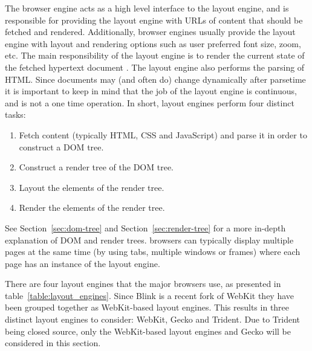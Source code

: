 \documentclass[a4paper,11pt]{kth-mag}
\begin{document}
        The \gls{browser} engine acts as a high level interface to the \gls{layout engine}, and is responsible for providing the \gls{layout engine} with \glspl{URL} of content that should be fetched and rendered.
        Additionally, \gls{browser} engines usually provide the \gls{layout engine} with layout and rendering options such as user preferred font size, zoom, etc.
        The main responsibility of the \gls{layout engine} is to render the current state of the fetched \gls{hypertext} \gls{document} \cite{garsiel2011browsers}.
        The \gls{layout engine} also performs the parsing of \gls{HTML}.
        Since \glspl{document} may (and often do) change dynamically after parsetime it is important to keep in mind that the job of the \gls{layout engine} is continuous, and is not a one time operation.
        In short, \glspl{layout engine} perform four distinct tasks:
        \begin{enumerate}
          \item Fetch content (typically \gls{HTML}, \gls{CSS} and \gls{JavaScript}) and parse it in order to construct a \gls{DOM} tree. 
          \item Construct a \gls{render tree} of the \gls{DOM} tree.
          \item Layout the \glspl{element} of the \gls{render tree}.
          \item Render the \glspl{element} of the \gls{render tree}.
        \end{enumerate}
        See Section~\ref{sec:dom-tree} and Section~\ref{sec:render-tree} for a more in-depth explanation of \gls{DOM} and \glspl{render tree}.
        \Glspl{browser} can typically display multiple pages at the same time (by using tabs, multiple windows or frames) where each page has an instance of the \gls{layout engine}.

        There are four \glspl{layout engine} that the major \glspl{browser} use, as presented in table~\ref{table:layout_engines}.
        Since \gls{Blink} is a recent \gls{fork} of \gls{WebKit} they have been grouped together as \gls{WebKit}-based \glspl{layout engine}.
        This results in three distinct \glspl{layout engine} to consider: \gls{WebKit}, \gls{Gecko} and \gls{Trident}.
        Due to \gls{Trident} being closed source, only the \gls{WebKit}-based \glspl{layout engine} and \gls{Gecko} will be considered in this section.
\end{document}
